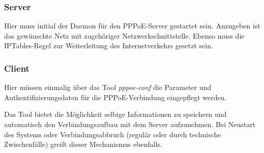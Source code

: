 		 \subsubsection{Server}
         Hier muss initial der Daemon für den \ac{PPPoE}-Server gestartet sein. Anzugeben ist das gewünschte
         Netz mit zugehöriger Netzwerkschnittstelle. Ebenso muss die IPTables-Regel zur Weiterleitung
         des Internetverkehrs gesetzt sein.

         \subsubsection{Client}
         Hier müssen einmalig über das Tool \textit{pppoe-conf} die Parameter und Authentifizierungsdaten
         für die \ac{PPPoE}-Verbindung eingepflegt werden.

         Das Tool bietet die Möglichkeit selbige Informationen
         zu speichern und automatisch den Verbindungsaufbau mit dem Server aufzunehmen. Bei Neustart
         des Systems oder Verbindungsabbruch (regulär oder durch technische Zwischenfälle) greift dieser
         Mechanismus ebenfalls.

\clearpage
